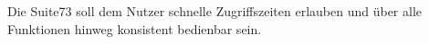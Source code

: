 Die Suite73 soll dem Nutzer schnelle Zugriffszeiten erlauben und über alle Funktionen hinweg konsistent bedienbar sein.